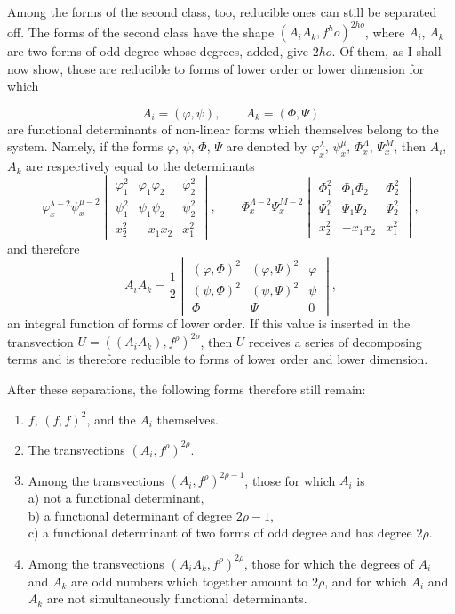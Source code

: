 \documentclass[10pt]{article}
\begin{document}
Among the forms of the second class, too, reducible ones can still be separated off. The forms of the second class have the shape $(A_iA_k,f^
ho)^{2
ho}$, where $A_i$, $A_k$ are two forms of odd degree whose degrees, added, give $2
ho$. Of them, as I shall now show, those are reducible to forms of lower order or lower dimension for which

\[
A_i=(\varphi,\psi),
\qquad
A_k=(\Phi,\Psi)
\]
are functional determinants of non-linear forms which themselves belong to the system. Namely, if the forms $\varphi$, $\psi$, $\Phi$, $\Psi$ are denoted by $\varphi_x^\lambda$, $\psi_x^\mu$, $\Phi_x^\Lambda$, $\Psi_x^M$, then $A_i$, $A_k$ are respectively equal to the determinants
\[
\varphi_x^{\lambda-2}\psi_x^{\mu-2}
\begin{vmatrix}
\varphi_1^2&\varphi_1\varphi_2&\varphi_2^2\\
\psi_1^2&\psi_1\psi_2&\psi_2^2\\
x_2^2&-x_1x_2&x_1^2
\end{vmatrix},
\qquad
\Phi_x^{\Lambda-2}\Psi_x^{M-2}
\begin{vmatrix}
\Phi_1^2&\Phi_1\Phi_2&\Phi_2^2\\
\Psi_1^2&\Psi_1\Psi_2&\Psi_2^2\\
x_2^2&-x_1x_2&x_1^2
\end{vmatrix},
\]
and therefore
\[
A_iA_k=\frac12
\begin{vmatrix}
(\varphi,\Phi)^2&(\varphi,\Psi)^2&\varphi\\
(\psi,\Phi)^2&(\psi,\Psi)^2&\psi\\
\Phi&\Psi&0
\end{vmatrix},
\]
an integral function of forms of lower order. If this value is inserted in the transvection $U=((A_iA_k),f^\rho)^{2\rho}$, then $U$ receives a series of decomposing terms and is therefore reducible to forms of lower order and lower dimension.

After these separations, the following forms therefore still remain:
\begin{enumerate}
\item $f$, $(f,f)^2$, and the $A_i$ themselves.
\item The transvections $(A_i,f^\rho)^{2\rho}$.
\item Among the transvections $(A_i,f^\rho)^{2\rho-1}$, those for which $A_i$ is\\
a) not a functional determinant,\\
b) a functional determinant of degree $2\rho-1$,\\
c) a functional determinant of two forms of odd degree and has degree $2\rho$.
\item Among the transvections $(A_iA_k,f^\rho)^{2\rho}$, those for which the degrees of $A_i$ and $A_k$ are odd numbers which together amount to $2\rho$, and for which $A_i$ and $A_k$ are not simultaneously functional determinants.
\end{enumerate}
\end{document}
